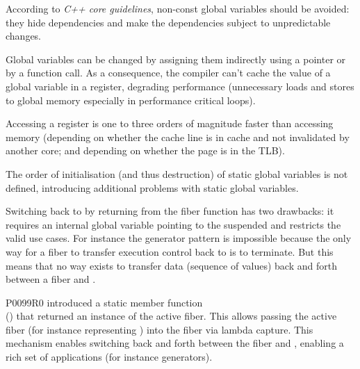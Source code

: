 \label{problem_gpub}

According to \emph{C++ core guidelines}\cite{coreguidlines}, non-const global
variables should be avoided: they hide dependencies and make the
dependencies subject to unpredictable changes.

Global variables can be changed by assigning them indirectly using a pointer or
by a function call. As a consequence, the compiler can't cache the value of a
global variable in a register, degrading performance (unnecessary
loads and stores to global memory especially in performance critical loops).

Accessing a register is one to three orders of magnitude faster than accessing
memory (depending on whether the cache line is in cache and not invalidated by
another core; and depending on whether the page is in the TLB).

The order of initialisation (and thus destruction) of static global
variables is not defined, introducing additional problems with static
global variables.


Switching back to \main by returning from the fiber function has two drawbacks:
it requires an internal global variable pointing to the suspended \main and
restricts the valid use cases.
For instance the generator pattern is impossible because the only way
for a fiber to transfer execution control back to \main is to terminate. But
this means that no way exists to transfer data (sequence of values) back and
forth between a fiber and \main.


P0099R0\cite{P0099R0} introduced a static member function\\
() that returned an instance of the active
fiber. This allows passing the active fiber  (for instance representing
\main) into the fiber  via lambda capture. This mechanism enables
switching back and forth between the fiber and \main, enabling a rich set of
applications (for instance generators).

